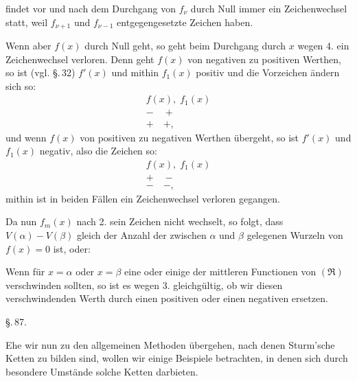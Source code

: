 
findet vor und nach dem Durchgang von $f_\nu$ durch Null immer
ein Zeichenwechsel statt, weil $f_{\nu+1}$ und $f_{\nu-1}$
entgegengesetzte Zeichen haben.

Wenn aber $f(x)$ durch Null geht, so geht beim Durchgang durch
$x$ wegen 4. ein Zeichenwechsel verloren. Denn geht $f(x)$ von
negativen zu positiven Werthen, so ist (vgl. \S.\,32) $f'(x)$
und mithin $f_1(x)$ positiv und die Vorzeichen ändern sich so:
\[
\begin{array}{c}
f(x), \; f_1(x) \\
- \quad + \\
+ \quad +,
\end{array}
\]
und wenn $f(x)$ von positiven zu negativen Werthen übergeht, so
ist $f'(x)$ und $f_1(x)$ negativ, also die Zeichen so:
\[
\begin{array}{c}
f(x), \; f_1(x) \\
+ \quad - \\
- \quad -,
\end{array}
\]
mithin ist in beiden Fällen ein Zeichenwechsel verloren gegangen.

Da nun $f_m(x)$ nach 2. sein Zeichen nicht wechselt, so folgt,
dass $V(\alpha) - V(\beta)$ gleich der Anzahl der zwischen
$\alpha$ und $\beta$ gelegenen Wurzeln von $f(x) = 0$ ist, oder:


Wenn für $x = \alpha$ oder $x = \beta$ eine oder einige der
mittleren Functionen von $(\mathfrak{R})$ verschwinden sollten,
so ist es wegen 3. gleichgültig, ob wir diesen verschwindenden
Werth durch einen positiven oder einen negativen ersetzen.

\begin{center}
\S.\,87.

\end{center}

Ehe wir nun zu den allgemeinen Methoden übergehen, nach denen
Sturm'sche Ketten zu bilden sind, wollen wir einige Beispiele
betrachten, in denen sich durch besondere Umstände solche Ketten
darbieten.
